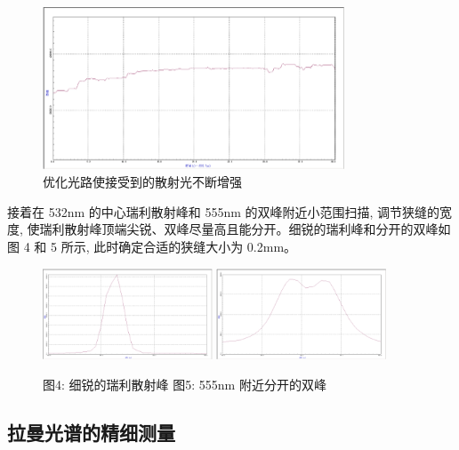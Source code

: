 \documentclass{article}
\begin{document}
\begin{figure}[h]
    \centering
    \includegraphics[width=0.8\textwidth]{图片 3.png} %
    \caption{优化光路使接受到的散射光不断增强}
    \label{fig:optimization}
\end{figure}

接着在 532nm 的中心瑞利散射峰和 555nm 的双峰附近小范围扫描, 调节狭缝的宽度, 使瑞利散射峰顶端尖锐、双峰尽量高且能分开。细锐的瑞利峰和分开的双峰如图 4 和 5 所示, 此时确定合适的狭缝大小为 0.2mm。

\begin{figure}[h]
    \centering
    \includegraphics[width=0.45\textwidth]{图片 4.png} %
    \quad
    \includegraphics[width=0.45\textwidth]{图片 5.png} %
    \caption{图4: 细锐的瑞利散射峰 \quad 图5: 555nm 附近分开的双峰}
    \label{fig:narrow_peaks}
\end{figure}


\subsection{拉曼光谱的精细测量}
\end{document}

